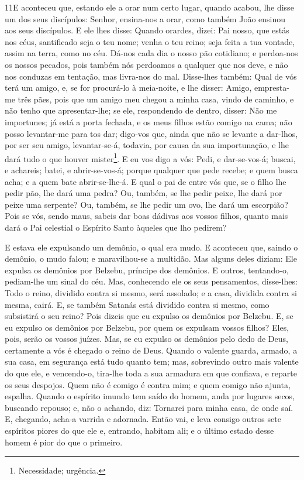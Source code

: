 \medskip

\lettrine{11} E aconteceu que, estando ele a orar num certo
lugar, quando acabou, lhe disse um dos seus discípulos: Senhor,
ensina-nos a orar, como também João ensinou aos seus discípulos.
E ele lhes disse: Quando orardes, dizei: Pai nosso, que estás
nos céus, santificado seja o teu nome; venha o teu reino; seja feita
a tua vontade, assim na terra, como no céu. Dá-nos cada dia o
nosso pão cotidiano; e perdoa-nos os nossos pecados, pois também
nós perdoamos a qualquer que nos deve, e não nos conduzas em
tentação, mas livra-nos do mal. Disse-lhes também: Qual de vós
terá um amigo, e, se for procurá-lo à meia-noite, e lhe disser:
Amigo, empresta-me três pães, pois que um amigo meu chegou a
minha casa, vindo de caminho, e não tenho que apresentar-lhe; se
ele, respondendo de dentro, disser: Não me importunes; já está a
porta fechada, e os meus filhos estão comigo na cama; não posso
levantar-me para tos dar; digo-vos que, ainda que não se levante
a dar-lhos, por ser seu amigo, levantar-se-á, todavia, por causa da
sua importunação, e lhe dará tudo o que houver
mister\footnote{Necessidade; urgência.}. E eu vos digo a vós:
Pedi, e dar-se-vos-á; buscai, e achareis; batei, e abrir-se-vos-á;
porque qualquer que pede recebe; e quem busca acha; e a quem
bate abrir-se-lhe-á. E qual o pai de entre vós que, se o
filho lhe pedir pão, lhe dará uma pedra? Ou, também, se lhe pedir
peixe, lhe dará por peixe uma serpente? Ou, também, se lhe
pedir um ovo, lhe dará um escorpião? Pois se vós, sendo maus,
sabeis dar boas dádivas aos vossos filhos, quanto mais dará o Pai
celestial o Espírito Santo àqueles que lho pedirem?

E estava ele expulsando um demônio, o qual era mudo. E aconteceu
que, saindo o demônio, o mudo falou; e maravilhou-se a multidão.
Mas alguns deles diziam: Ele expulsa os demônios por Belzebu,
príncipe dos demônios. E outros, tentando-o, pediam-lhe um
sinal do céu. Mas, conhecendo ele os seus pensamentos,
disse-lhes: Todo o reino, dividido contra si mesmo, será assolado; e
a casa, dividida contra si mesma, cairá. E, se também Satanás
está dividido contra si mesmo, como subsistirá o seu reino? Pois
dizeis que eu expulso os demônios por Belzebu. E, se eu
expulso os demônios por Belzebu, por quem os expulsam vossos filhos?
Eles, pois, serão os vossos juízes. Mas, se eu expulso os
demônios pelo dedo de Deus, certamente a vós é chegado o reino de
Deus. Quando o valente guarda, armado, a sua casa, em
segurança está tudo quanto tem; mas, sobrevindo outro mais
valente do que ele, e vencendo-o, tira-lhe toda a sua armadura em
que confiava, e reparte os seus despojos. Quem não é comigo é
contra mim; e quem comigo não ajunta, espalha. Quando o
espírito imundo tem saído do homem, anda por lugares secos, buscando
repouso; e, não o achando, diz: Tornarei para minha casa, de onde
saí. E, chegando, acha-a varrida e adornada. Então
vai, e leva consigo outros sete espíritos piores do que ele e,
entrando, habitam ali; e o último estado desse homem é pior do que o
primeiro.

